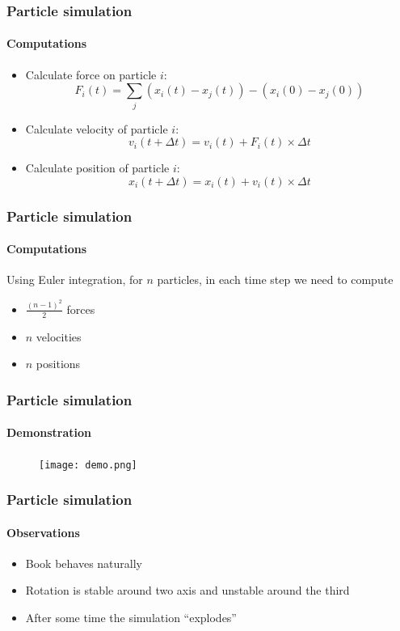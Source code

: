 \documentclass{beamer}
\begin{document}
\begin{frame}
 \frametitle{Particle simulation}
 \framesubtitle{Computations}
 \begin{itemize}
  \item Calculate force on particle $i$:
  \begin{displaymath}
   F_i(t) = \sum_j (x_i(t) - x_j(t)) - (x_i(0) - x_j(0))
  \end{displaymath}
  \item Calculate velocity of particle $i$:
  \begin{displaymath}
   v_i(t + \Delta t) = v_i(t) + F_i(t) \times \Delta t
  \end{displaymath}
  \item Calculate position of particle $i$:
  \begin{displaymath}
   x_i(t + \Delta t) = x_i(t) + v_i(t) \times \Delta t
  \end{displaymath}
 \end{itemize}
\end{frame}

\begin{frame}
 \frametitle{Particle simulation}
 \framesubtitle{Computations}
 Using Euler integration, for $n$ particles, in each time step we need to compute
 \begin{itemize}
  \item $\frac{(n-1)^2}{2}$ forces
  \item $n$ velocities
  \item $n$ positions
 \end{itemize}
\end{frame}

\begin{frame}
 \frametitle{Particle simulation}
 \framesubtitle{Demonstration}
 \begin{figure}
  \centering
  \texttt{[image: demo.png]}
 \end{figure}
\end{frame}

\begin{frame}
 \frametitle{Particle simulation}
 \framesubtitle{Observations}
 \begin{itemize}
  \item Book behaves naturally
  \item Rotation is stable around two axis and unstable around the third
  \item After some time the simulation ``explodes''
 \end{itemize}
\end{frame}
\end{document}
